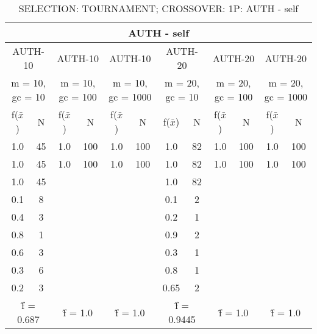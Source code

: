 \begin{table}[H]
	\centering
	\caption{SELECTION: TOURNAMENT; CROSSOVER: 1P: AUTH - self}
	\begin{adjustbox}{width=1\textwidth}
		\begin{tabular}{ |c|c||c|c||c|c||c|c||c|c||c|c| }
			\hline
			\multicolumn{12}{|c|}{AUTH - self} \\
			\hline
			\multicolumn{2}{|c||}{AUTH-10} & \multicolumn{2}{c||}{AUTH-10} & \multicolumn{2}{c||}{AUTH-10} & \multicolumn{2}{c||}{AUTH-20} & \multicolumn{2}{c||}{AUTH-20} & \multicolumn{2}{c|}{AUTH-20}\\
			\hline
			\multicolumn{2}{|c||}{m = 10, gc = 10} & \multicolumn{2}{c||}{m = 10, gc = 100} & \multicolumn{2}{c||}{m = 10, gc = 1000} & \multicolumn{2}{c||}{m = 20, gc = 10} & \multicolumn{2}{c||}{m = 20, gc = 100} & \multicolumn{2}{c|}{m = 20, gc = 1000}\\
			\hline
			f($\bar{x}$) & N & f($\bar{x}$) & N & f($\bar{x}$) & N & f($\bar{x}$) & N & f($\bar{x}$) & N & f($\bar{x}$) & N\\
			\hline
			\hline
			1.0 & 45 & 1.0 & 100 & 1.0 & 100 & 1.0 & 82 & 1.0 & 100 & 1.0 & 100\\
			\hline
			1.0 & 45 & 1.0 & 100 & 1.0 & 100 & 1.0 & 82 & 1.0 & 100 & 1.0 & 100\\
			1.0 & 45 &   &   &   &   & 1.0 & 82 &   &   &   &  \\
			0.1 & 8 &   &   &   &   & 0.1 & 2 &   &   &   &  \\
			0.4 & 3 &   &   &   &   & 0.2 & 1 &   &   &   &  \\
			0.8 & 1 &   &   &   &   & 0.9 & 2 &   &   &   &  \\
			0.6 & 3 &   &   &   &   & 0.3 & 1 &   &   &   &  \\
			0.3 & 6 &   &   &   &   & 0.8 & 1 &   &   &   &  \\
			0.2 & 3 &   &   &   &   & 0.65 & 2 &   &   &   &  \\
			\hline
			\multicolumn{2}{|c||}{\^{f} = 0.687} & \multicolumn{2}{c||}{\^{f} = 1.0} & \multicolumn{2}{c||}{\^{f} = 1.0} & \multicolumn{2}{c||}{\^{f} = 0.9445} & \multicolumn{2}{c||}{\^{f} = 1.0} & \multicolumn{2}{c|}{\^{f} = 1.0}\\
			\hline
		\end{tabular}
	\end{adjustbox}
\end{table}
